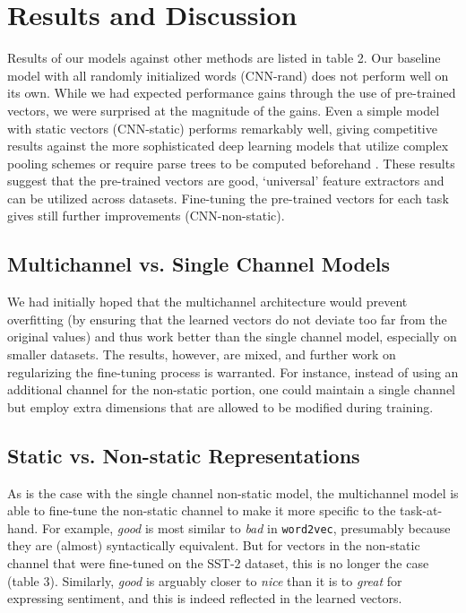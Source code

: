 \documentclass[11pt]{article}
\begin{document}
\section{Results and Discussion}
Results of our models against other methods are listed in table 2. Our baseline model with all randomly initialized words (CNN-rand) does not perform well on its own. While we had expected performance gains through the use of pre-trained vectors, we were surprised at the magnitude of the gains. Even a simple model with static vectors (CNN-static) performs remarkably well, giving competitive results against the more sophisticated deep learning models that utilize complex pooling schemes \cite{Kalch:2014} or require parse trees to be computed beforehand \cite{Socher:2013}.  These results suggest that the pre-trained vectors are good, `universal' feature extractors and can be utilized across datasets. Fine-tuning the pre-trained vectors for each task gives still further improvements (CNN-non-static).
\subsection{Multichannel vs. Single Channel Models}
We had initially hoped that the multichannel architecture would prevent overfitting (by ensuring that the learned vectors do not deviate too far from the original values) and thus work better than the single channel model, especially on smaller datasets. The results, however, are mixed, and further work on regularizing the fine-tuning process is warranted. For instance, instead of using an additional channel for the non-static portion, one could maintain a single channel but employ extra dimensions that are allowed to be modified during training.

\subsection{Static vs. Non-static Representations}
As is the case with the single channel non-static model, the multichannel model is able to fine-tune the non-static channel to make it more specific to the task-at-hand. For example, \textit{good} is most similar to \textit{bad} in \texttt{word2vec}, presumably because they are (almost) syntactically equivalent. But for vectors in the non-static channel that were fine-tuned on the SST-2 dataset, this is no longer the case (table 3). Similarly,  \textit{good} is arguably closer to \textit{nice} than it is to \textit{great} for expressing sentiment, and this is indeed reflected in the learned vectors.
\end{document}

